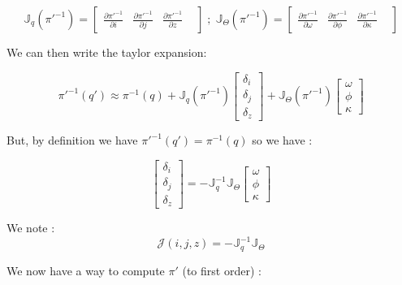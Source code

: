 \begin{equation}
	\mathbb{J}_q(\pi'^{-1}) =
\begin{bmatrix}
       \frac{\partial \pi'^{-1}}{\partial i } &
       \frac{\partial \pi'^{-1}}{\partial j } &
       \frac{\partial \pi'^{-1}}{\partial z } &
\end{bmatrix}
   \; ; \;
      \mathbb{J}_\Theta(\pi'^{-1}) =
\begin{bmatrix}
       \frac{\partial \pi'^{-1}}{\partial \omega } &
       \frac{\partial \pi'^{-1}}{\partial \phi } &
       \frac{\partial \pi'^{-1}}{\partial \kappa } &
\end{bmatrix}
\end{equation}

We can then write the taylor expansion:

\begin{equation}
        \pi'^{-1}(q')
      \approx      \pi^{-1}(q) 
          +   \mathbb{J}_q(\pi'^{-1}) \begin{bmatrix} \delta_i \\ \delta_j \\ \delta_z  \end{bmatrix}
          +   \mathbb{J}_\Theta(\pi'^{-1}) \begin{bmatrix} \omega \\ \phi \\ \kappa  \end{bmatrix}
\end{equation}

But, by definition we have $ \pi'^{-1}(q') =  \pi^{-1}(q) $ so we have :


\begin{equation}
	 \begin{bmatrix} \delta_i \\ \delta_j \\ \delta_z  \end{bmatrix} 
    =  - \mathbb{J}_q ^{-1} \mathbb{J}_\Theta \begin{bmatrix} \omega \\ \phi \\ \kappa  \end{bmatrix}
\end{equation}


We note :
\begin{equation}
	\mathcal{J}(i,j,z) = - \mathbb{J}_q ^{-1} \mathbb{J}_\Theta
\end{equation}

We now have a way to compute $\pi'$ (to first order) : 

